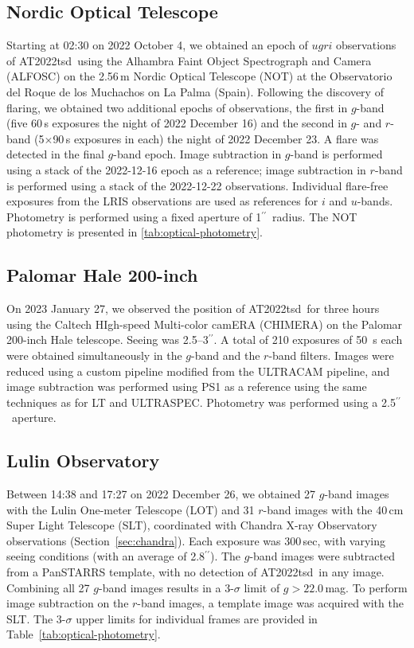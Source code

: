 \documentclass{nature_plusfigure}
\newcommand{\at}{AT2022tsd}
\newcommand{\arcsec}{$^{\prime\prime}$}
\begin{document}
\begin{methods}
\subsection{Nordic Optical Telescope}
\label{sec:not}

Starting at 02:30 on 2022 October 4, we obtained an epoch of $ugri$ observations of \at\ using the Alhambra Faint Object Spectrograph and Camera (ALFOSC) on the 2.56\,m Nordic Optical Telescope (NOT) at the Observatorio del Roque de los Muchachos on La Palma (Spain). Following the discovery of flaring, we obtained two additional epochs of observations, the first in $g$-band (five 60\,s exposures the night of 2022 December 16) and the second in $g$- and $r$-band (5$\times$90\,s exposures in each) the night of 2022 December 23. A flare was detected in the final $g$-band epoch.  Image subtraction in $g$-band is performed using a stack of the 2022-12-16 epoch as a reference; image subtraction in $r$-band is performed using a stack of the 2022-12-22 observations.  Individual flare-free exposures from the LRIS observations are used as references for $i$ and $u$-bands.  Photometry is performed using a fixed aperture of 1\arcsec\ radius.
The NOT photometry is presented in \ref{tab:optical-photometry}.


\subsection{Palomar Hale 200-inch}
\label{sec:chimera}

On 2023 January 27, we observed the position of \at\ for three hours using the Caltech HIgh-speed Multi-color camERA (CHIMERA\cite{Harding2016}) on the Palomar 200-inch Hale telescope. Seeing was 2.5--3\arcsec.
A total of 210 exposures of 50~s each were obtained simultaneously in the $g$-band and the $r$-band filters. Images were reduced using a custom pipeline modified from the ULTRACAM pipeline\cite{Dhillon2007}, and image subtraction was performed using PS1 as a reference using the same techniques as for LT and ULTRASPEC. Photometry was performed using a 2.5\arcsec\ aperture.

\subsection{Lulin Observatory}
\label{sec:lulin}

Between 14:38 and 17:27 on 2022 December 26, we obtained 
27 $g$-band images with the Lulin One-meter Telescope (LOT) and 31 $r$-band images with the 40\,cm Super Light Telescope (SLT), coordinated with Chandra X-ray Observatory observations (Section~\ref{sec:chandra}). Each exposure was 300\,sec, with varying seeing conditions (with an average of 2.8\arcsec). The $g$-band images were subtracted from a PanSTARRS template, with no detection of \at\ in any image.
Combining all 27 $g$-band images results in a 3-$\sigma$ limit of $g>22.0$\,mag.
To perform image subtraction on the $r$-band images, a template image was acquired with the SLT.
The 3-$\sigma$ upper limits for individual frames are provided in Table~\ref{tab:optical-photometry}.


\end{methods}
\end{document}
